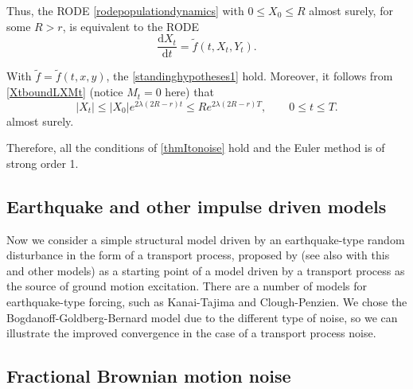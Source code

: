 \documentclass[reqno,12pt]{amsart}
\theoremstyle{plain}%
\theoremstyle{definition}
\begin{document}
Thus, the RODE \eqref{rodepopulationdynamics} with $0\leq X_0 \leq R$ almost surely, for some $R > r$, is equivalent to the RODE
\begin{equation}
    \label{rodepopulationdynamicstruncated}
    \frac{\mathrm{d}X_t}{\mathrm{d}t} = \tilde f(t, X_t, Y_t).
\end{equation}

With $\tilde f=\tilde f(t, x, y)$, the \cref{standinghypotheses1} hold. Moreover, it follows from \eqref{XtboundLXMt} (notice $M_t = 0$ here) that
\[
    |X_t| \leq |X_0|e^{2\lambda (2R - r)t} \leq R e^{2\lambda (2R - r)T}, \qquad 0 \leq t \leq T.
\]
almost surely. 

Therefore, all the conditions of \cref{thmItonoise} hold and the Euler method is of strong order 1.

\subsection{Earthquake and other impulse driven models}

Now we consider a simple structural model driven by an earthquake-type random disturbance in the form of a transport process, proposed by \cite{BogdanoffGoldbergBernard1961} (see also \cite[Chapter 18]{NeckelRupp2013} with this and other models) as a starting point of a model driven by a transport process as the source of ground motion excitation. There are a number of models for earthquake-type forcing, such as Kanai-Tajima and Clough-Penzien. We chose the Bogdanoff-Goldberg-Bernard model due to the different type of noise, so we can illustrate the improved convergence in the case of a transport process noise.

\subsection{Fractional Brownian motion noise}
\end{document}

